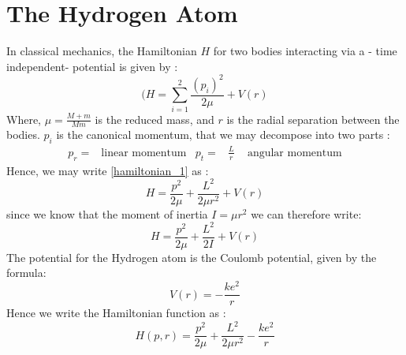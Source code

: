 \chapter{The Hydrogen Atom}
In classical mechanics, the Hamiltonian $H$ for two bodies interacting via a - time independent- potential is given by :
\begin{equation}
(H= \sum_{i=1} ^2 \frac{(p_i)^2}{2 \mu}+ V(r)
\label{hamiltonian_1}
\end{equation}
Where, $ \mu = \frac{M+m}{Mm}$ is the reduced mass, and $r$ is the radial separation between the bodies. $p_i$ is the canonical momentum, that we may decompose into two parts :
\begin{align}
p_r =& \text{linear momentum} & p_t=& \frac{L}{r}\;\;\; \text{ angular momentum}
\end{align}
Hence, we may write \eqref{hamiltonian_1} as :
\begin{equation}
H = \frac{p^2}{2 \mu}+ \frac{L^2}{2\mu r^2} + V(r)
\end{equation}
since we know that the moment of inertia $I = \mu r^2$ we can therefore write: 
\begin{equation}
H = \frac{p^2}{2 \mu}+ \frac{L^2}{2I} + V(r)
\end{equation}
The potential for the Hydrogen atom is the Coulomb potential, given by the formula:
\begin{equation}
V(r) = - \frac{k e^2}{r}
\end{equation}
Hence we write the Hamiltonian function as :
\begin{equation}
H(p,r) =  \frac{p^2}{2 \mu}+ \frac{L^2}{2\mu r^2} - \frac{k e^2}{r}
\label{hafun}
\end{equation}
